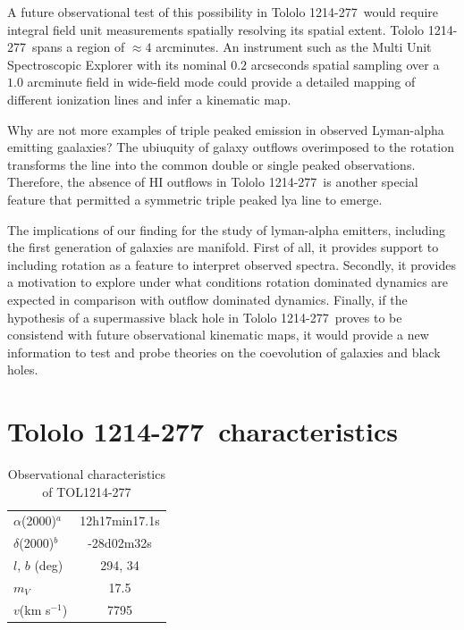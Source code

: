 \documentclass[a4paper, usenatbib, 12pt]{article}
\newcommand{\tol}{Tololo 1214-277}
\begin{document}
{A future observational test of this possibility in \tol\ would require
integral field unit measurements spatially resolving its spatial
extent. 
\tol\ spans a region of $\approx 4$ arcminutes. 
An instrument such as the Multi Unit Spectroscopic Explorer with its
nominal $0.2$ arcseconds spatial sampling over a $1.0$ arcminute field
in wide-field mode could provide a detailed mapping of different
ionization lines and infer a kinematic map.

Why are not more examples of triple peaked emission in observed
Lyman-alpha emitting gaalaxies?  
The ubiuquity of galaxy outflows overimposed to the rotation
transforms the line into the common double or single peaked
observations.  
Therefore, the absence of HI outflows in \tol\ is another special
feature that permitted a symmetric triple peaked lya line to emerge. 

The implications of our finding for the study of lyman-alpha
emitters, including the first generation of galaxies are
manifold. First of all, it provides support to including rotation as a
feature to interpret observed spectra. Secondly, it provides a
motivation to explore under what conditions rotation dominated
dynamics are expected in comparison with outflow dominated
dynamics. Finally, if the hypothesis of a supermassive black hole in
\tol\ proves to be consistend with future observational kinematic
maps, it would provide a new information to test and probe theories on
the coevolution of galaxies and black holes.
 

{}


\newpage 

\section*{\tol\ characteristics}


\begin{table}
\begin{center}
\begin{tabular}{lc}
$\alpha$(2000)$^{a}$ & 12h17min17.1s\\
$\delta$(2000)$^{b}$ & -28d02m32s\\
$l$, $b$ (deg) & 294, 34\\
$m_V$ & 17.5\\
$v$(km s$^{-1}$) & 7795
\end{tabular}
\end{center}

\caption{Observational characteristics of TOL1214-277
  \cite{Thuan97}\\} 
\end{table}

}
\end{document}
